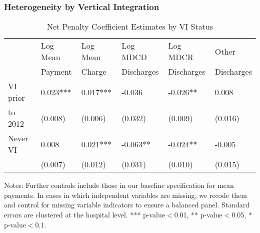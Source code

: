 \documentclass{beamer}
\begin{document}
\begin{frame}
\frametitle{Heterogeneity by Vertical Integration}
\begin{table}[htp]
\centering \normalsize
\caption{Net Penalty Coefficient Estimates by VI Status}
\footnotesize
\begin{tabular}{llllll}
\hline	\hline
 			& Log Mean 		& Log Mean	& Log MDCD 	   	& Log MDCR   		& Other  			\\
			& Payment		& 	Charge	& Discharges      	& Discharges       	& Discharges    \\
\hline											
VI prior 	&	0.023*** & 0.017*** & -0.036 & -0.026** & 0.008 	\\
\hspace{3mm}to 2012			&	(0.008) & (0.006) & (0.032) & (0.009) & (0.016) 	\\
\hline											
Never VI 	&	0.008 & 0.021*** &  -0.063** &  -0.024** &  -0.005 	\\
			&	(0.007) & (0.012) & (0.031) & (0.010) & (0.015) 	\\
\hline
\end{tabular}
\end{table}
\tiny Notes: Further controls include those in our baseline specification for mean payments. In cases in which independent variables are missing, we recode them and control for missing variable indicators to ensure a balanced panel. Standard errors are clustered at the hospital level. *** p-value$<$0.01, ** p-value$<$0.05, * p-value$<$0.1.
\end{frame}
\end{document}
